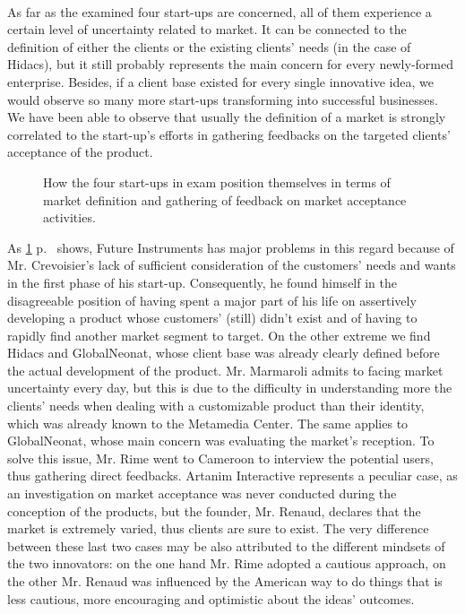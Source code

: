 \documentclass[twoside]{report}
\begin{document}
\paragraph{}
As far as the examined four start-ups are concerned, all of them experience a certain level of uncertainty related to market. It can be connected to the definition of either the clients or the existing clients’ needs (in the case of Hidacs), but it still probably represents the main concern for every newly-formed enterprise. Besides, if a client base existed for every single innovative idea, we would observe so many more start-ups transforming into successful businesses. 
We have been able to observe that usually the definition of a market is strongly correlated to the start-up’s efforts in gathering feedbacks on the targeted clients’ acceptance of the product.
\begin{figure}
\begin{center}
\caption{How the four start-ups in exam position themselves in terms of market definition and gathering of feedback on market acceptance activities.}
\label{fig:position}
\end{center}
\end{figure}
As \ref{fig:position} p.~\pageref{fig:position} shows, Future Instruments has major problems in this regard because of Mr. Crevoisier’s lack of sufficient consideration of the customers’ needs and wants in the first phase of his start-up. Consequently, he found himself in the disagreeable position of having spent a major part of his life on assertively developing a product whose customers’ (still) didn’t exist and of having to rapidly find another market segment to target. On the other extreme we find Hidacs and GlobalNeonat, whose client base was already clearly defined before the actual development of the product. Mr. Marmaroli admits to facing market uncertainty every day, but this is due to the difficulty in understanding more the clients’ needs when dealing with a customizable product than their identity, which was already known to the Metamedia Center. The same applies to GlobalNeonat, whose main concern was evaluating the market’s reception. To solve this issue, Mr. Rime went to Cameroon to interview the potential users, thus gathering direct feedbacks. Artanim Interactive represents a peculiar case, as an investigation on market acceptance was never conducted during the conception of the products, but the founder, Mr. Renaud, declares that the market is extremely varied, thus clients are sure to exist. The very difference between these last two cases may be also attributed to the different mindsets of the two innovators: on the one hand Mr. Rime adopted a cautious approach, on the other Mr. Renaud was influenced by the American way to do things that is less cautious, more encouraging and optimistic about the ideas’ outcomes. 
\end{document}
